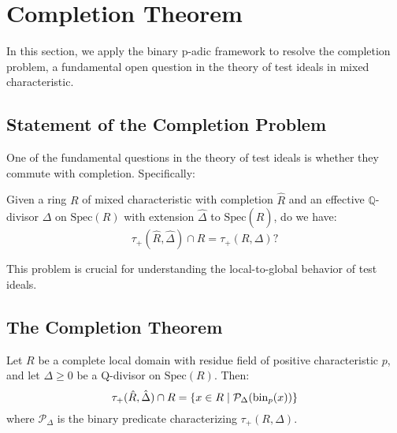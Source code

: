 \section{Completion Theorem}\label{sec:completion}

In this section, we apply the binary p-adic framework to resolve the completion problem, a fundamental open question in the theory of test ideals in mixed characteristic.

\subsection{Statement of the Completion Problem}

One of the fundamental questions in the theory of test ideals is whether they commute with completion. Specifically:

\begin{problem}\label{prob:completion}
Given a ring $R$ of mixed characteristic with completion $\hat{R}$ and an effective $\mathbb{Q}$-divisor $\Delta$ on $\text{Spec}(R)$ with extension $\hat{\Delta}$ to $\text{Spec}(\hat{R})$, do we have:
$$\tau_+(\hat{R},\hat{\Delta}) \cap R = \tau_+(R,\Delta) \text{?}$$
\end{problem}

This problem is crucial for understanding the local-to-global behavior of test ideals.

\subsection{The Completion Theorem}

\begin{theorem}\label{thm:completion}
Let $R$ be a complete local domain with residue field of positive characteristic $p$, and let $\Delta \geq 0$ be a Q-divisor on $\text{Spec}(R)$. Then:
$$\tau_+(\hat{R},\hat{\Delta}) \cap R = \{x \in R \mid \mathcal{P}_\Delta(\operatorname{bin}_p(x))\}$$
where $\mathcal{P}_\Delta$ is the binary predicate characterizing $\tau_+(R,\Delta)$.
\end{theorem}

